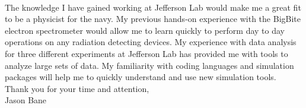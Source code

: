 \documentclass[12pt,letterpaper]{article}
\begin{document}
\paragraph{}The knowledge I have gained working at Jefferson Lab would make me a great fit to be a physicist for the navy. My previous hands-on experience with the BigBite electron spectrometer would allow me to learn quickly to perform day to day operations on any radiation detecting devices. My experience with data analysis for three different experiments at Jefferson Lab has provided me with tools to analyze large sets of data. My familiarity with coding languages and simulation packages will help me to quickly understand and use new simulation tools.\\


\noindent Thank you for your time and attention,\\
\noindent Jason Bane
\end{document}
